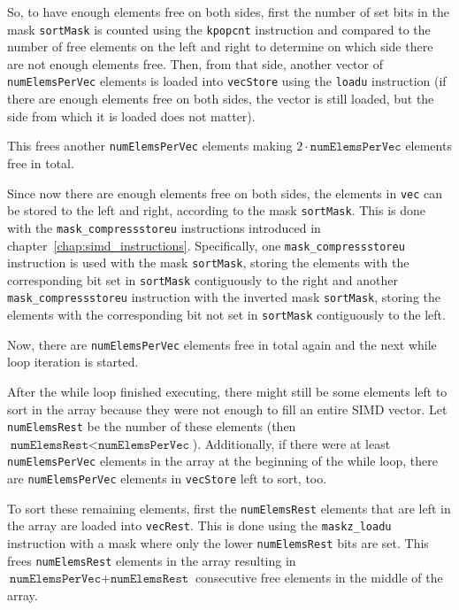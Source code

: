 \documentclass[12pt, a4paper, openright, twoside]{tiarbeit}
\begin{document}
So, to have enough elements free on both sides,
first the number of set bits in the mask \texttt{sortMask} is counted using the
\texttt{kpopcnt} instruction and
compared to the number of free elements
on the left and right to determine on which side there are not enough elements
free. Then, from that side, another vector of
\texttt{numElemsPerVec} elements is loaded into \texttt{vecStore} using the
\texttt{loadu} instruction
(if there are enough elements free on both sides,
the vector is still loaded, but the side from which it is loaded does not matter).

This frees another \texttt{numElemsPerVec} elements making $2\cdot \texttt{numElemsPerVec}$
elements free in total.

Since now there are enough elements free on both sides, the elements in \texttt{vec}
can be stored to the left and right, according to the mask \texttt{sortMask}.
This is done with the \texttt{mask\_compressstoreu} instructions introduced in
chapter~\ref{chap:simd_instructions}. Specifically, one \texttt{mask\_compressstoreu}
instruction is used with the mask \texttt{sortMask}, storing the elements with
the corresponding bit set in \texttt{sortMask} contiguously to the right and
another \texttt{mask\_compressstoreu} instruction with the inverted mask
\texttt{sortMask}, storing the elements with the corresponding bit not set in
\texttt{sortMask} contiguously to the left.

Now, there are \texttt{numElemsPerVec} elements free in total again and the
next while loop iteration is started.

After the while loop finished executing, there might still be
some elements left
to sort in the array because they were not enough to fill an entire SIMD vector.
Let \texttt{numElemsRest} be the number of these elements
(then $\texttt{numElemsRest} < \texttt{numElemsPerVec}$).
Additionally, if there were at least \texttt{numElemsPerVec} elements in the array
at the beginning of the while loop, there are \texttt{numElemsPerVec}
elements in \texttt{vecStore} left to sort, too.

To sort these remaining elements, first the \texttt{numElemsRest} elements
that are left in the array are loaded into \texttt{vecRest}.
This is done using the \texttt{maskz\_loadu} instruction with a mask where
only the lower \texttt{numElemsRest} bits are set. This frees
\texttt{numElemsRest} elements in the array resulting in
$\texttt{numElemsPerVec}+\texttt{numElemsRest}$ consecutive free elements
in the middle of the array.
\end{document}
